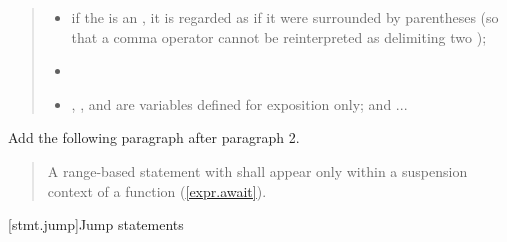 \begin{quote}
\begin{itemize}
\item
if the  is an ,
it is regarded as if it were surrounded by parentheses (so that a comma operator
cannot be reinterpreted as delimiting two );
\item {}
\item {}, , and  are variables defined for
exposition only; and ...
\end{itemize}
\end{quote}





Add the following paragraph after paragraph 2.

\begin{quote}
	\setcounter{Paras}{2}
	\pnum
	A range-based  statement with  shall appear only within a suspension context of a function (\ref{expr.await}).
\end{quote}
%
%
%
%
%
%
%
\pagebreak
\setcounter{section}{5}
[stmt.jump]{Jump statements}%

